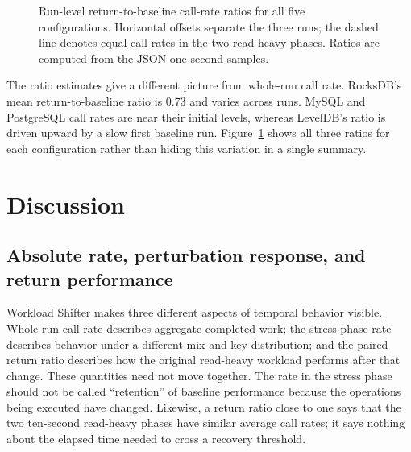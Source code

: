 \documentclass[10pt]{article}
\begin{document}
\begin{figure}[htbp]
\centering
{}
\caption{Run-level return-to-baseline call-rate ratios for all five configurations. Horizontal offsets separate the three runs; the dashed line denotes equal call rates in the two read-heavy phases. Ratios are computed from the JSON one-second samples.}
\label{fig:recovery}
\end{figure}

The ratio estimates give a different picture from whole-run call rate. RocksDB's mean return-to-baseline ratio is 0.73 and varies across runs. MySQL and PostgreSQL call rates are near their initial levels, whereas LevelDB's ratio is driven upward by a slow first baseline run. Figure~\ref{fig:recovery} shows all three ratios for each configuration rather than hiding this variation in a single summary.

\section{Discussion}
\label{sec:discussion}
\subsection{Absolute rate, perturbation response, and return performance}
Workload Shifter makes three different aspects of temporal behavior visible. Whole-run call rate describes aggregate completed work; the stress-phase rate describes behavior under a different mix and key distribution; and the paired return ratio describes how the original read-heavy workload performs after that change. These quantities need not move together. The rate in the stress phase should not be called ``retention'' of baseline performance because the operations being executed have changed. Likewise, a return ratio close to one says that the two ten-second read-heavy phases have similar average call rates; it says nothing about the elapsed time needed to cross a recovery threshold.
\end{document}

